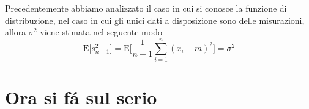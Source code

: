 \documentclass{exam}
\begin{document}
      Precedentemente abbiamo analizzato il caso in cui si conosce la funzione di distribuzione, nel caso in cui gli unici dati a disposizione sono delle misurazioni, allora $\sigma^2$ viene stimata nel seguente modo
      \begin{displaymath}
        \textrm{E}\Big[s_{n-1}^2\Big]=
        \textrm{E}\Bigg[\frac{1}{n-1}\sum_{i=1}^{n}(x_{i}-m)^2\Bigg]=\sigma^2 
      \end{displaymath}
  \section{Ora si f\'a sul serio}
\end{document}
